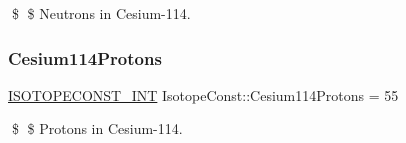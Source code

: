 \$ \$ Neutrons in Cesium-\/114. \mbox{\label{group___isotope_const-_cesium-_cs114_gaafc6fd8a049e046ecdd1438aa9439577}} 
\subsubsection{\texorpdfstring{Cesium114\+Protons}{Cesium114Protons}}
{\footnotesize\ttfamily \mbox{\hyperlink{group___isotope_const-_macros_ga5f18360b3e99483a35c32d789e62621c}{I\+S\+O\+T\+O\+P\+E\+C\+O\+N\+S\+T\+\_\+\+I\+NT}} Isotope\+Const\+::\+Cesium114\+Protons = 55}

\$ \$ Protons in Cesium-\/114. 
